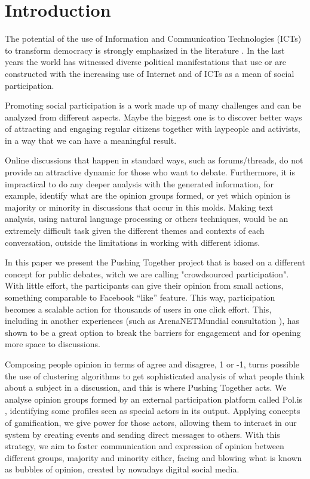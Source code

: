 \documentclass{llncs}
\begin{document}
\section{Introduction}
\label{sec:intro}

  The potential of the use of Information and Communication Technologies (ICTs)
to transform democracy is strongly emphasized in the literature
\cite{benkler} \cite{castells} \cite{levy}. In the last years the world has
witnessed diverse political manifestations that use or are constructed with
the increasing use of Internet and of ICTs as a mean of social participation.

  Promoting social participation is a work made up of many challenges and can
be analyzed from different aspects. Maybe the biggest one is to discover better
ways of attracting and engaging regular citizens together with laypeople and
activists, in a way that we can have a meaningful result.

  Online discussions that happen in standard ways, such as forums/threads, do
not provide an attractive dynamic for those who want to debate. Furthermore, it
is impractical to do any deeper analysis with the generated information, for
example, identify what are the opinion groups formed, or yet which opinion is
majority or minority in discussions that occur in this molds. Making text
analysis, using natural language processing or others techniques, would be an
extremely difficult task given the different themes and contexts of each
conversation, outside the limitations in working with different idioms.

  In this paper we present the Pushing Together project that is based on a
different concept for public debates, witch we are calling "crowdsourced
participation". With little effort, the participants can give their
opinion from small actions, something comparable to Facebook ``like'' feature.
This way, participation becomes a scalable action for thousands of users in
one click effort. This, including in another experiences (such as ArenaNETMundial
consultation \cite{arenanetmundial}), has shown to be a great option to break
the barriers for engagement and for opening more space to discussions.

  Composing people opinion in terms of agree and disagree, 1 or -1, turns
possible the use of clustering algorithms to get sophisticated analysis of what
people think about a subject in a discussion, and this is where Pushing
Together acts. We analyse opinion groups formed by an external participation
platform called Pol.is \cite{polisSite},
identifying some profiles seen as special actors in its output.
Applying concepts of gamification, we give power for those
actors, allowing them to interact in our system by creating events and
sending direct messages to others. With this strategy, we aim to foster
communication and expression of opinion between different groups, majority and
minority either, facing and blowing what is known as
bubbles \cite{polisInTaiwan} of opinion, created by nowadays digital
social media.
\end{document}
